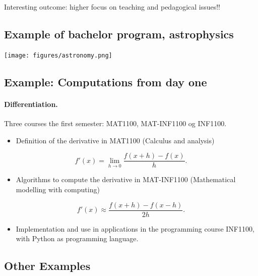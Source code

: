 \documentclass[%
twoside,                 %
final,                   %
10pt]{article}
\begin{document}
\noindent
Interesting outcome: higher focus on teaching and pedagogical issues!!




\subsection{Example of bachelor program, astrophysics}

\paragraph{}


\centerline{\texttt{[image: figures/astronomy.png]}}




\subsection{Example: Computations from day one}

\paragraph{Differentiation.}
Three courses the first semester:  MAT1100, MAT-INF1100 og INF1100.
\begin{itemize}
\item Definition  of the derivative in  MAT1100 (Calculus and analysis) 
\end{itemize}

\noindent
\[
 f'(x)=\lim_{h \rightarrow 0}\frac{f(x+h)-f(x)}{h}.
\]
\begin{itemize}
\item Algorithms to compute the derivative in MAT-INF1100  (Mathematical modelling with computing)
\end{itemize}

\noindent
\[
 f'(x)\approx \frac{f(x+h)-f(x-h)}{2h}.
\]
\begin{itemize}
\item Implementation and use in applications in  the programming course INF1100, with Python as programming language. 
\end{itemize}

\noindent




\subsection{Other Examples}
\end{document}
